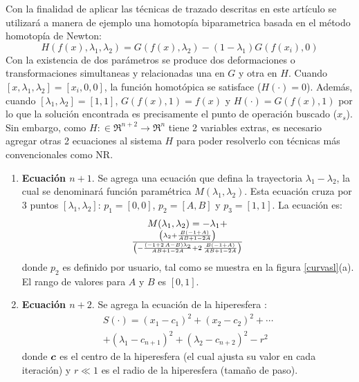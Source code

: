 \documentclass[conference,letterpaper,twocolumn]{IEEEtran}
\newcommand{\pig}[1]{\mbox{\boldmath ${#1}$}	}
\begin{document}
Con la finalidad de aplicar las técnicas de trazado descritas en este artículo se utilizará
a manera de ejemplo una homotopía biparametrica basada en el método homotopía de Newton:
{\small
\begin{equation}
{H}({f}({x}),\lambda_1,\lambda_2 ) =
G (f(x),\lambda_2)-(1-\lambda_1 )G (f(x_i),0) 
\label{hexamp1l}
\end{equation}}
Con la existencia de dos parámetros se produce dos deformaciones o transformaciones
simultaneas y relacionadas una en $G$ y otra en $H$. Cuando $[x,\lambda_1,\lambda_2]=[x_i,0,0]$, 
la función homotópica se satisface ($H(\cdot)=0$).
Además, cuando $[\lambda_1,\lambda_2]=[1,1]$, $G(f(x),1)=f(x)$ y $H(\cdot)=G(f(x),1)$ por lo que la solución
encontrada es precisamente el punto de operación buscado ($x_s$). Sin embargo, como $H:\in \mathfrak{R}^{n+2}\to\mathfrak{R}^n$
tiene 2 variables extras, es necesario agregar otras 2 ecuaciones al sistema $H$ para poder resolverlo con técnicas
más convencionales como NR.
\begin{enumerate}
\item {\bf Ecuación $n+1$}. Se agrega una ecuación que defina la trayectoria $\lambda_1-\lambda_2$, la cual 
se denominará función paramétrica $M(\lambda_1,\lambda_2)$. Esta ecuación cruza por 3 puntos $[\lambda_1,\lambda_2]$:
$p_1=[0,0]$, $p_2=[A,B]$ y $p_3=[1,1]$. La ecuación es:
{
\begin{equation}
\begin{array}{c}
M(\lambda_1,\lambda_2)=-\lambda_{{1}}+\\ { \left( \lambda_{{2}}+{\frac {B \left( - 1+A \right) }
{AB+ 1- 2A}} \right) \over  \left( -{\frac { \left( - 1+ 2\,
A- B \right) \lambda_{{2}}}{AB+ 1- 2A}}+ 2\,{\frac {B
 \left( - 1+A \right) }{AB+ 1- 2A}} \right) }
\end{array}
\label{homotopiaPx4}
\end{equation}
}
donde $p_2$ es definido por usuario, tal como se muestra en la figura \ref{curvasl}(a). 
El rango de valores para $A$ y $B$ es $[0,1]$.
\item {\bf Ecuación $n+2$}. Se agrega la ecuación de la hiperesfera \cite{hiper}:
{\small
\begin{equation}
\begin{array}{c}
S(\cdot)=(x_1-c_1)^2+ (x_2-c_2)^2+ \cdots \\ + (\lambda_1-c_{n+1})^2+(\lambda_2-c_{n+2})^2-r^2
\end{array}
\label{hiperesfera}
\end{equation}
}
donde $\pig{c}$ es el centro
de la hiperesfera (el cual ajusta su valor en cada iteración) y $r\ll 1$ es el radio de la hiperesfera 
(tamaño de paso). 
\end{enumerate}
\end{document}
